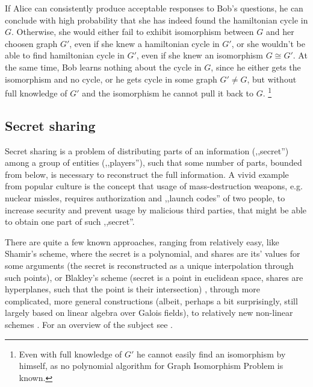 \documentclass[10pt]{article}
\begin{document}
\vspace{2mm}

If Alice can consistently produce acceptable responses to Bob's questions, he can conclude with high
probability that she has indeed found the hamiltonian cycle in \(G\). Otherwise, she would either fail
to exhibit isomorphism between \(G\) and her choosen graph \(G'\), even if she knew a hamiltonian
cycle in \(G'\), or she wouldn't be able to find hamiltonian cycle in \(G'\), even if she knew an
isomorphism \(G\cong G'\). At the same time, Bob learns nothing about the cycle in \(G\), since he
either gets the isomorphism and no cycle, or he gets cycle in some graph \(G'\neq G\), but without
full knowledge of \(G'\) and the isomorphism he cannot pull it back to \(G\).
\footnote{Even with full knowledge of \(G'\) he cannot easily find an isomorphism by himself, as no
polynomial algorithm for Graph Isomorphism Problem is known.}


\subsection{Secret sharing}

Secret sharing is a problem of distributing parts of an information (,,secret'') among a group of
entities (,,players''), such that some number of parts, bounded from below, is necessary to 
reconstruct the full information. A vivid example from popular culture is the concept that usage
of mass-destruction weapons, e.g. nuclear missles, requires authorization and ,,launch codes'' of
two people, to increase security and prevent usage by malicious third parties, that might be able
to obtain one part of such ,,secret''.

There are quite a few known approaches, ranging from relatively easy, like Shamir's scheme, where
the secret is a polynomial, and shares are its' values for some arguments (the secret is reconstructed
as a unique interpolation through such points), or Blakley's scheme (secret is a point in euclidean
space, shares are hyperplanes, such that the point is their intersection) \footnotemark, through more
complicated, more general constructions (albeit, perhaps a bit surprisingly, still largely based on linear
algebra over Galois fields), to relatively new non-linear schemes \cite{Beimel01onthe}. For an overview 
of the subject see \cite{SharingSurvey}.

\end{document}
